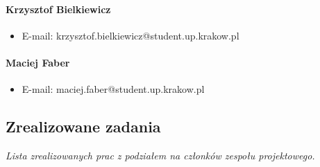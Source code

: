 \documentclass[12pt,a4paper,oneside]{article}
\theoremstyle{definition}
\numberwithin{equation}{section}
\begin{document}
    \paragraph{Krzysztof Bielkiewicz}
    \begin{itemize}
        \item E-mail:  krzysztof.bielkiewicz@student.up.krakow.pl
    \end{itemize}
    \paragraph{Maciej Faber}
    \begin{itemize}
        \item E-mail: maciej.faber@student.up.krakow.pl
    \end{itemize}

\subsection{Zrealizowane zadania}
\textit{Lista zrealizowanych prac z podziałem na członków zespołu projektowego.}
\end{document}
